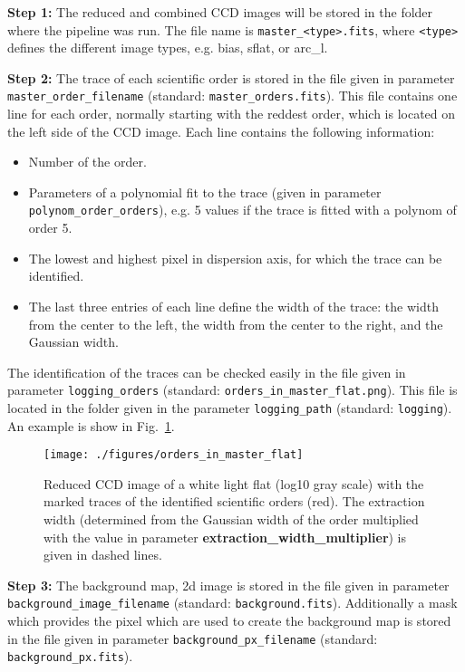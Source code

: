 \documentclass[10pt,a4paper]{article}
\begin{document}
\noindent \textbf{Step 1:} The reduced and combined CCD images will be stored in the folder where the pipeline was run. The file name is \verb|master_<type>.fits|, where \verb|<type>| defines the different image types, e.g. bias, sflat, or arc\_l.

\vspace{0.5em}\noindent \textbf{Step 2:} The trace of each scientific order is stored in the file given in parameter \verb|master_order_filename| (standard: \verb|master_orders.fits|). This file contains one line for each order, normally starting with the reddest order, which is located on the left side of the CCD image. Each line contains the following information:
\begin{itemize}\setlength\itemsep{0em}
  \item Number of the order.
  \item Parameters of a polynomial fit to the trace (given in parameter \verb|polynom_order_orders|), e.g. 5 values if the trace is fitted with a polynom of order 5.
  \item The lowest and highest pixel in dispersion axis, for which the trace can be identified.
  \item The last three entries of each line define the width of the trace: the width from the center to the left, the width from the center to the right, and the Gaussian width.
\end{itemize}
The identification of the traces can be checked easily in the file given in parameter \verb|logging_orders| (standard: \verb|orders_in_master_flat.png|). This file is located in the folder given in the parameter \verb|logging_path| (standard: \verb|logging|). An example is show in Fig.~\ref{figure_orders_in_master_flat}.

\begin{figure} 
  \begin{center}
    \texttt{[image: ./figures/orders\_in\_master\_flat]}
  \end{center} 
  \caption{Reduced CCD image of a white light flat (log10 gray scale) with the marked traces of the identified scientific orders (red). The extraction width (determined from the Gaussian width of the order multiplied with the value in parameter \textbf{extraction\_width\_multiplier}) is given in dashed lines.
    \label{figure_orders_in_master_flat}}
\end{figure}


\vspace{0.5em}\noindent \textbf{Step 3:} The background map, 2d image is stored in the file given in parameter \verb|background_image_filename| (standard: \verb|background.fits|). Additionally a mask which provides the pixel which are used to create the background map is stored in the file given in parameter \verb|background_px_filename| (standard: \verb|background_px.fits|).
\end{document}
